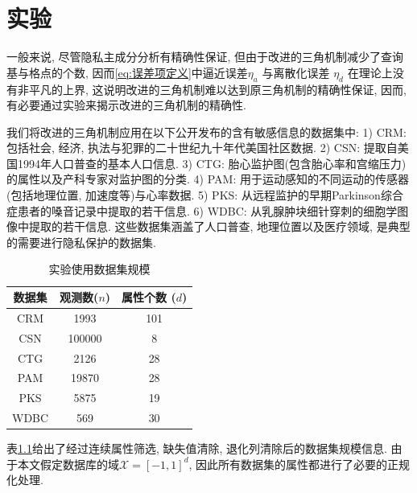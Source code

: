 \chapter{实验} %
\label{cha:实验}
一般来说, 尽管隐私主成分分析有精确性保证, 但由于改进的三角机制减少了查询基与格点的个数, 因而\eqref{eq:误差项定义}中逼近误差$\eta_a$ 与离散化误差 $\eta_d$ 在理论上没有非平凡的上界, 这说明改进的三角机制难以达到原三角机制的精确性保证, 因而, 有必要通过实验来揭示改进的三角机制的精确性.

我们将改进的三角机制应用在以下公开发布的含有敏感信息的数据集中: 1) CRM\parencite{dataset:CRM}: 包括社会, 经济, 执法与犯罪的二十世纪九十年代美国社区数据. 2) CSN\parencite{dataset:CSN}: 提取自美国1994年人口普查的基本人口信息. 3) CTG\parencite{dataset:CTG}: 胎心监护图(包含胎心率和宫缩压力)的属性以及产科专家对监护图的分类. 4) PAM\parencite{dataset:PAM}: 用于运动感知的不同运动的传感器(包括地理位置, 加速度等)与心率数据. 5) PKS\parencite{dataset:PKS}: 从远程监护的早期Parkinson综合症患者的嗓音记录中提取的若干信息. 6)  WDBC\parencite{dataset:WDBC}: 从乳腺肿块细针穿刺的细胞学图像中提取的若干信息. 这些数据集涵盖了人口普查, 地理位置以及医疗领域, 是典型的需要进行隐私保护的数据集.
\renewcommand{\arraystretch}{1.5}
\begin{table}[hbtp]\centering
  \caption{实验使用数据集规模}\label{tab:数据集规模}
  \begin{tabular}{c|cc}
    \hline
    数据集 & 观测数($n$) & 属性个数 ($d$) \\
    \hline
    CRM & 1993 & 101 \\
    CSN & 100000 & 8 \\
    CTG & 2126 & 28 \\
    PAM & 19870 & 28 \\
    PKS & 5875 & 19 \\
    WDBC & 569 & 30 \\
    \hline
  \end{tabular}
\end{table}
\renewcommand{\arraystretch}{1}

表\ref{tab:数据集规模}给出了经过连续属性筛选, 缺失值清除, 退化列清除后的数据集规模信息. 由于本文假定数据库的域$\mathcal{X} = [-1, 1]^d$, 因此所有数据集的属性都进行了必要的正规化处理. 


